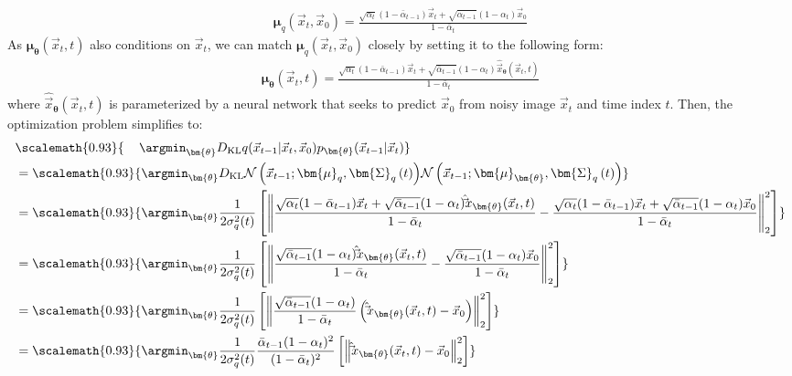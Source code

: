 \begin{align}
    \bm{\mu}_q(\vec{x}_t, \vec{x}_0) = \frac{\sqrt{\alpha_t}(1-\bar\alpha_{t-1})\vec{x}_{t} + \sqrt{\bar\alpha_{t-1}}(1-\alpha_t)\vec{x}_0}{1 -\bar\alpha_{t}}
\end{align}
As $\bm{\mu}_{\bm{\theta}}(\vec{x}_t, t)$ also conditions on $\vec{x}_t$, we can match $\bm{\mu}_q(\vec{x}_t, \vec{x}_0)$ closely by setting it to the following form:
\begin{align}
    \bm{\mu}_{\bm{\theta}}(\vec{x}_t, t) = \frac{\sqrt{\alpha_t}(1-\bar\alpha_{t-1})\vec{x}_{t} + \sqrt{\bar\alpha_{t-1}}(1-\alpha_t)\hat \vec{x}_{\bm{\theta}}(\vec{x}_t, t)}{1 -\bar\alpha_{t}}
\end{align}
where $\hat \vec{x}_{\bm{\theta}}(\vec{x}_t, t)$ is parameterized by a neural network that seeks to predict $\vec{x}_0$ from noisy image $\vec{x}_t$ and time index $t$. Then, the optimization problem simplifies to:
\begingroup
\allowdisplaybreaks
\begin{align}
& \scalemath{0.93}{\quad \,\argmin_{\bm{\theta}} D_{\rm{KL}}{q(\vec{x}_{t-1}|\vec{x}_t, \vec{x}_0)}{p_{\bm{\theta}}(\vec{x}_{t-1}|\vec{x}_t)}} \nonumber \\
&= \scalemath{0.93}{\argmin_{\bm{\theta}}D_{\rm{KL}}{\mathcal{N}\left(\vec{x}_{t-1}; \bm{\mu}_q,\bm{\Sigma}_q\left(t\right)\right)}{\mathcal{N}\left(\vec{x}_{t-1}; \bm{\mu}_{\bm{\theta}},\bm{\Sigma}_q\left(t\right)\right)}}\\
&=\scalemath{0.93}{\argmin_{\bm{\theta}}\frac{1}{2\sigma_q^2(t)}\left[\left\lVert\frac{\sqrt{\alpha_t}(1-\bar\alpha_{t-1})\vec{x}_{t} + \sqrt{\bar\alpha_{t-1}}(1-\alpha_t)\hat \vec{x}_{\bm{\theta}}(\vec{x}_t, t)}{1 -\bar\alpha_{t}}-\frac{\sqrt{\alpha_t}(1-\bar\alpha_{t-1})\vec{x}_{t} + \sqrt{\bar\alpha_{t-1}}(1-\alpha_t)\vec{x}_0}{1 -\bar\alpha_{t}}\right\rVert_2^2\right]}\\
&=\scalemath{0.93}{\argmin_{\bm{\theta}}\frac{1}{2\sigma_q^2(t)}\left[\left\lVert\frac{\sqrt{\bar\alpha_{t-1}}(1-\alpha_t)\hat \vec{x}_{\bm{\theta}}(\vec{x}_t, t)}{1 -\bar\alpha_{t}}-\frac{\sqrt{\bar\alpha_{t-1}}(1-\alpha_t)\vec{x}_0}{1 -\bar\alpha_{t}}\right\rVert_2^2\right]}\\
&=\scalemath{0.93}{\argmin_{\bm{\theta}}\frac{1}{2\sigma_q^2(t)}\left[\left\lVert\frac{\sqrt{\bar\alpha_{t-1}}(1-\alpha_t)}{1 -\bar\alpha_{t}}\left(\hat \vec{x}_{\bm{\theta}}(\vec{x}_t, t) - \vec{x}_0\right)\right\rVert_2^2\right]}\\
&=\scalemath{0.93}{\argmin_{\bm{\theta}}\frac{1}{2\sigma_q^2(t)}\frac{\bar\alpha_{t-1}(1-\alpha_t)^2}{(1 -\bar\alpha_{t})^2}\left[\left\lVert\hat \vec{x}_{\bm{\theta}}(\vec{x}_t, t) - \vec{x}_0\right\rVert_2^2\right]} \label{eq:93}
\end{align}
